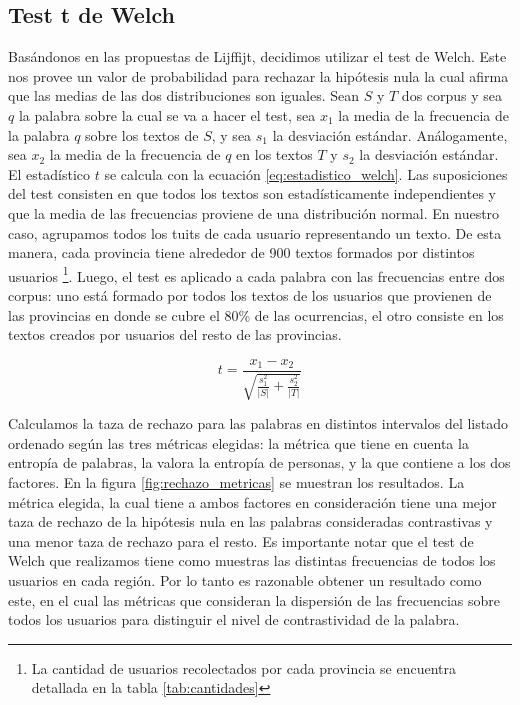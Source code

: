 \subsection{Test t de Welch}
Basándonos en las propuestas de Lijffijt, decidimos utilizar el test de Welch. Este nos provee un valor de probabilidad para rechazar la hipótesis nula la cual afirma que las medias de las dos distribuciones son iguales. Sean $S$ y $T$ dos corpus y sea $q$ la palabra sobre la cual se va a hacer el test, sea $x_1$ la media de la frecuencia de la palabra $q$ sobre los textos de $S$, y sea $s_1$ la desviación estándar. Análogamente, sea $x_2$ la media de la frecuencia de $q$ en los textos $T$ y $s_2$ la desviación estándar. El estadístico $t$ se calcula con la ecuación \ref{eq:estadistico_welch}. Las suposiciones del test consisten en que todos los textos son estadísticamente independientes y que la media de las frecuencias proviene de una distribución normal. En nuestro caso, agrupamos todos los tuits de cada usuario representando un texto. De esta manera, cada provincia tiene alrededor de 900 textos formados por distintos usuarios \footnote{La cantidad de usuarios recolectados por cada provincia se encuentra detallada en la tabla \ref{tab:cantidades}}. Luego, el test es aplicado a cada palabra con las frecuencias entre dos corpus: uno está formado por todos los textos de los usuarios que provienen de las provincias en donde se cubre el 80\% de las ocurrencias, el otro consiste en los textos creados por usuarios del resto de las provincias.

\begin{equation}
\label{eq:estadistico_welch}
 t = \frac{x_1-x_2}{\sqrt{\frac{s_1^2}{\lvert S \rvert}+\frac{s_2^2}{\lvert T \rvert}}}  
\end{equation}

Calculamos la taza de rechazo para las palabras en distintos intervalos del listado ordenado según las tres métricas elegidas: la métrica que tiene en cuenta la entropía de palabras, la valora la entropía de personas, y la que contiene a los dos factores. En la figura \ref{fig:rechazo_metricas} se muestran los resultados. La métrica elegida, la cual tiene a ambos factores en consideración tiene una mejor taza de rechazo de la hipótesis nula en las palabras consideradas contrastivas y una menor taza de rechazo para el resto. 
Es importante notar que el test de Welch que realizamos tiene como muestras las distintas frecuencias de todos los usuarios en cada región. Por lo tanto es razonable obtener un resultado como este, en el cual las métricas que consideran la dispersión de las frecuencias sobre todos los usuarios para distinguir el nivel de contrastividad de la palabra.

